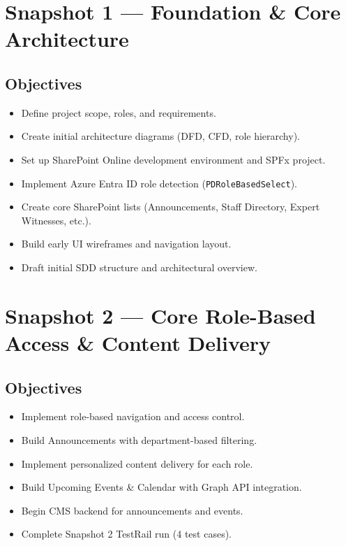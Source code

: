 \documentclass{article}
\begin{document}
\section*{Snapshot 1 --- Foundation \& Core Architecture}

\subsection*{Objectives}
\begin{itemize}
    \item Define project scope, roles, and requirements.
    \item Create initial architecture diagrams (DFD, CFD, role hierarchy).
    \item Set up SharePoint Online development environment and SPFx project.
    \item Implement Azure Entra ID role detection (\texttt{PDRoleBasedSelect}).
    \item Create core SharePoint lists (Announcements, Staff Directory, Expert Witnesses, etc.).
    \item Build early UI wireframes and navigation layout.
    \item Draft initial SDD structure and architectural overview.
\end{itemize}

\section*{Snapshot 2 --- Core Role-Based Access \& Content Delivery}

\subsection*{Objectives}
\begin{itemize}
    \item Implement role-based navigation and access control.
    \item Build Announcements with department-based filtering.
    \item Implement personalized content delivery for each role.
    \item Build Upcoming Events \& Calendar with Graph API integration.
    \item Begin CMS backend for announcements and events.
    \item Complete Snapshot 2 TestRail run (4 test cases).
\end{itemize}
\end{document}
